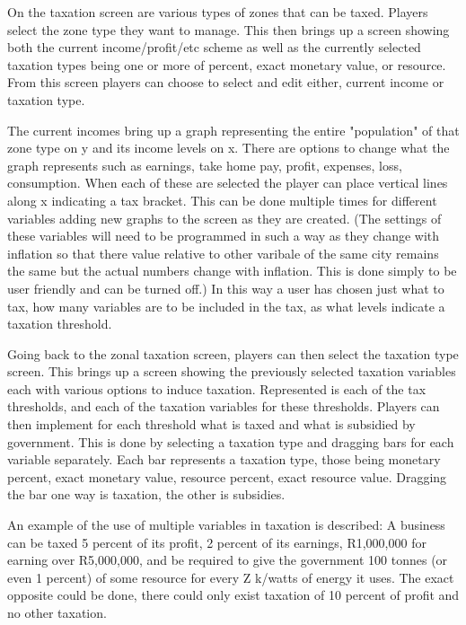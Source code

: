 On the taxation screen are various types of zones that can be taxed. Players select the zone type they want to manage. This then brings up a screen showing both the current income/profit/etc scheme as well as the currently selected taxation types being one or more of percent, exact monetary value, or resource. 
From this screen players can choose to select and edit either, current income or taxation type.

The current incomes bring up a graph representing the entire "population" of that zone type on y and its income levels on x. There are options to change what the graph represents such as earnings, take home pay, profit, expenses, loss, consumption. When each of these are selected the player can place vertical lines along x indicating a tax bracket. This can be done multiple times for different variables adding new graphs to the screen as they are created. (The settings of these variables will need to be programmed in such a way as they change with inflation so that there value relative to other varibale of the same city remains the same but the actual numbers change with inflation. This is done simply to be user friendly and can be turned off.) In this way a user has chosen just what to tax, how many variables are to be included in the tax, as what levels indicate a taxation threshold.

Going back to the zonal taxation screen, players can then select the taxation type screen. This brings up a screen showing the previously selected taxation variables each with various options to induce taxation. Represented is each of the tax thresholds, and each of the taxation variables for these thresholds. Players can then implement for each threshold what is taxed and what is subsidied by government. This is done by selecting a taxation type and dragging bars for each variable separately. Each bar represents a taxation type, those being monetary percent, exact monetary value, resource percent, exact resource value. Dragging the bar one way is taxation, the other is subsidies.

An example of the use of multiple variables in taxation is described:
A business can be taxed 5 percent of its profit, 2 percent of its earnings, R1,000,000 for earning over R5,000,000, and be required to give the government 100 tonnes (or even 1 percent) of some resource for every Z k/watts of energy it uses. The exact opposite could be done, there could only exist taxation of 10 percent of profit and no other taxation. 

